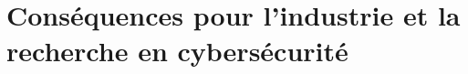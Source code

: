 \chapter{Conséquences pour l'industrie et la recherche en cybersécurité}
    \section{}
        \subsection{}
            \subsubsection{}